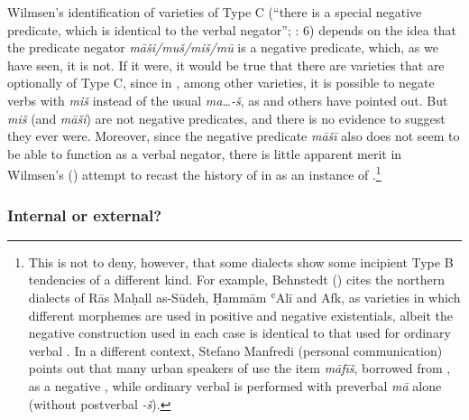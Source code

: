 \documentclass[output=paper]{langsci/langscibook}
\begin{document}
Wilmsen’s identification of  varieties of Type C (“there is a special negative  predicate, which is identical to the verbal negator”; \citealt{Croft1991}: 6) depends on the idea that the  predicate negator \textit{māši/muš/miš/mū} is a negative  predicate, which, as we have seen, it is not. If it were, it would be true that there are  varieties that are optionally of Type C, since in  , among other varieties, it is possible to negate verbs with \textit{miš} instead of the usual \textit{ma…-š}, as \citet{Mughazy2003} and others have pointed out. But  \textit{miš} (and  \textit{māši}) are not negative  predicates, and there is no evidence to suggest they ever were. Moreover, since the  negative  predicate \textit{māšī} also does not seem to be able to function as a verbal negator, there is little apparent merit in Wilmsen's (\citeyear{Wilmsen2014}) attempt to recast the history of  in  as an instance of .\footnote{This is not to deny, however, that some  dialects show some incipient Type B tendencies of a different kind. For example, Behnstedt (\citeyear[347]{Behnstedt2016Yemen}) cites the northern  dialects of Rās Maḥall as-Sūdeh, Ḥammām ʿAlī and Afk, as varieties in which different morphemes are used in positive and negative existentials, albeit the negative construction used in each case is identical to that used for ordinary verbal . In a different context, Stefano Manfredi (personal communication) points out that many urban speakers of   use the item \textit{māfīš}, borrowed from , as a negative , while ordinary verbal  is performed with preverbal \textit{mā} alone (without postverbal \textit{{}-š}).}




\subsubsection{Internal or external?}
\end{document}
